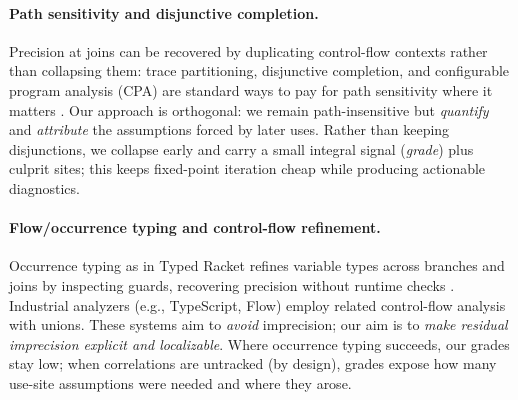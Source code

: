 \paragraph{Path sensitivity and disjunctive completion.}
Precision at joins can be recovered by duplicating control-flow contexts rather than collapsing them: 
trace partitioning, disjunctive completion, and configurable program analysis (CPA) are standard ways to pay for path sensitivity where it matters \cite{MauborgneRival2005,BeyerHenzinger2007}.
Our approach is orthogonal: we remain path-insensitive but \emph{quantify} and \emph{attribute} the assumptions forced by later uses.
Rather than keeping disjunctions, we collapse early and carry a small integral signal (\emph{grade}) plus culprit sites; this keeps fixed-point iteration cheap while producing actionable diagnostics.

\paragraph{Flow/occurrence typing and control-flow refinement.}
Occurrence typing as in Typed Racket refines variable types across branches and joins by inspecting guards, recovering precision without runtime checks \cite{TobinHochstadtFelleisen2008}.
Industrial analyzers (e.g., TypeScript, Flow) employ related control-flow analysis with unions.
These systems aim to \emph{avoid} imprecision; our aim is to \emph{make residual imprecision explicit and localizable}.
Where occurrence typing succeeds, our grades stay low; when correlations are untracked (by design), grades expose how many use-site assumptions were needed and where they arose.
